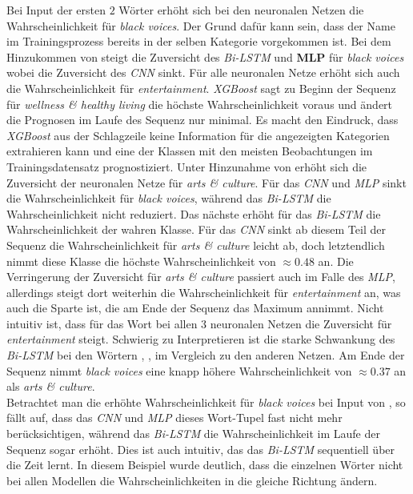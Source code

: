 \documentclass[a4paper,11pt]{article}
\begin{document}
Bei Input der ersten $2$ Wörter  erhöht sich bei den neuronalen Netzen die Wahrscheinlichkeit für \textit{black voices}. Der Grund dafür kann sein, dass der Name im Trainingsprozess bereits in der selben Kategorie vorgekommen ist. Bei dem Hinzukommen von  steigt die Zuversicht des \textit{Bi-LSTM} und \textbf{MLP} für \textit{black voices} wobei die Zuversicht des \textit{CNN} sinkt. Für alle neuronalen Netze erhöht sich auch die Wahrscheinlichkeit für \textit{entertainment}. \textit{XGBoost} sagt zu Beginn der Sequenz für \textit{wellness \& healthy living} die höchste Wahrscheinlichkeit voraus und ändert die Prognosen im Laufe des Sequenz nur minimal. Es macht den Eindruck, dass \textit{XGBoost} aus der Schlagzeile keine Information für die angezeigten Kategorien extrahieren kann und eine der Klassen mit den meisten Beobachtungen im Trainingsdatensatz prognostiziert. Unter Hinzunahme von  erhöht sich die Zuversicht der neuronalen Netze für \textit{arts \& culture}. Für das \textit{CNN} und \textit{MLP} sinkt die Wahrscheinlichkeit für \textit{black voices}, während das \textit{Bi-LSTM} die Wahrscheinlichkeit nicht reduziert. Das nächste \say{\textit{,}} erhöht für das \textit{Bi-LSTM} die Wahrscheinlichkeit der wahren Klasse. Für das \textit{CNN} sinkt ab diesem Teil der Sequenz die Wahrscheinlichkeit für \textit{arts \& culture} leicht ab, doch letztendlich nimmt diese Klasse die höchste Wahrscheinlichkeit von $\approx 0.48$ an. Die Verringerung der Zuversicht für \textit{arts \& culture} passiert auch im Falle des \textit{MLP}, allerdings steigt dort weiterhin die Wahrscheinlichkeit für \textit{entertainment} an, was auch die Sparte ist, die am Ende der Sequenz das Maximum annimmt. Nicht intuitiv ist, dass für das Wort  bei allen $3$ neuronalen Netzen die Zuversicht für \textit{entertainment} steigt. Schwierig zu Interpretieren ist die starke Schwankung des \textit{Bi-LSTM} bei den Wörtern , ,  im Vergleich zu den anderen Netzen. Am Ende der Sequenz nimmt \textit{black voices} eine knapp höhere Wahrscheinlichkeit von $\approx 0.37$ an als \textit{arts \& culture}.\\
Betrachtet man die erhöhte Wahrscheinlichkeit für \textit{black voices} bei Input von , so fällt auf, dass das \textit{CNN} und \textit{MLP} dieses Wort-Tupel fast nicht mehr berücksichtigen, während das \textit{Bi-LSTM} die Wahrscheinlichkeit im Laufe der Sequenz sogar erhöht. Dies ist auch intuitiv, das das \textit{Bi-LSTM} sequentiell über die Zeit lernt. In diesem Beispiel wurde deutlich, dass die einzelnen Wörter nicht bei allen Modellen die Wahrscheinlichkeiten in die gleiche Richtung ändern.\\
\end{document}
